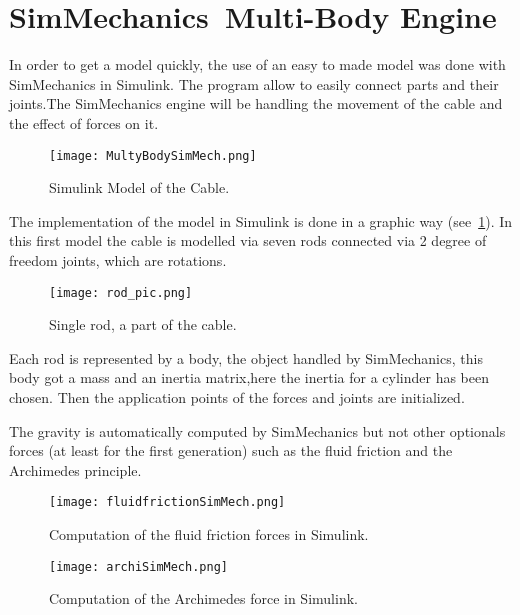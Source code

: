  
\section{SimMechanics\texttrademark ~Multi-Body Engine}

In order to get a model quickly, the use of an easy to made model was done with SimMechanics in Simulink.
The program allow to easily connect parts and their joints.The SimMechanics engine will be handling the movement of the cable and the effect of forces on it.

\begin{figure}[H]
\centering
    \texttt{[image: MultyBodySimMech.png]}
    \caption{Simulink Model of the Cable.}
    \label{fig:SimulinkFullMod}
\end{figure}

The implementation of the model in Simulink is done in a graphic way (see~\ref{fig:SimulinkFullMod}). In
this first model the cable is modelled via seven rods connected via 2 degree of freedom joints, which are rotations.

\begin{figure}[H]
\centering
    \texttt{[image: rod\_pic.png]}
    \caption{Single rod, a part of the cable.}
    \label{fig:SingleRod}
\end{figure}

Each rod is represented by a body, the object handled by SimMechanics, this body got a mass and an inertia matrix,here the inertia for a cylinder has been chosen. Then the application points of the forces and joints are
initialized.

The gravity is automatically computed by SimMechanics but not other optionals forces (at least for the first generation) such as the fluid friction and the Archimedes principle. 

\begin{figure}[H]
\centering
    \begin{minipage}[b]{0.4\textwidth}
    \centering
    \texttt{[image: fluidfrictionSimMech.png]}
    \caption{Computation of the fluid friction forces in Simulink.}
    \label{fig:fluidSimMech}
    \end{minipage}
    \hfill
    \begin{minipage}[b]{0.4\textwidth}
    \centering
    \texttt{[image: archiSimMech.png]}
    \caption{Computation of the Archimedes force in Simulink.}
    \label{fig:archSimMech}
    \end{minipage}
\end{figure}

